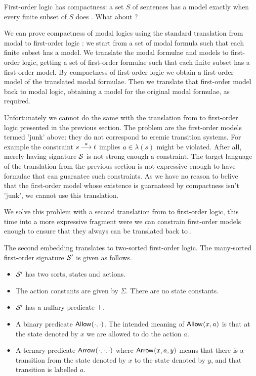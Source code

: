 \NI First-order logic has compactness: a set $S$ of sentences has a
model exactly when every finite subset of $S$ does \cite[Chapter
  4.3]{EndertonHB:matinttl}. What about \ELABR{}? 

We can prove compactness of modal logics using the standard
translation from modal to first-order logic \cite{BlackburnP:modlog}:
we start from a set of modal formula such that each finite subset has
a model. We translate the modal formulae and models to first-order
logic, getting a set of first-order formulae such that each finite
subset has a first-order model. By compactness of first-order logic we
obtain a first-order model of the translated modal formulae. Then we
translate that first-order model back to modal logic, obtaining a
model for the original modal formulae, as required.

Unfortunately we cannot do the same with the translation from \ELABR{}
to first-order logic presented in the previous section. The problem
are the first-order models termed 'junk' above: they do not correspond
to eremic transition systems.  For example the constraint $s
\stackrel{a}{\longrightarrow} t$ implies $a \in \lambda(s)$ might be violated. After all,
merely having signature $\mathcal{S}$ is not strong enough a constraint. The
target language of the translation from the previous section is not
expressive enough to have formulae that can guarantee such
constraints.  As we have no reason to belive that the first-order
model whose existence is guarnateed by compactness isn't 'junk', we
cannot use this translation.

We solve this problem with a second translation from \ELABR{} to
first-order logic, this time into a more expressive fragment were we
can constrain first-order models enough to ensure that they always can
be translated back to \ELFULL{}.

The second embedding translates \ELFULL{} to two-sorted first-order
logic. The many-sorted first-order signature $\mathcal{S}'$ is given as follows.
\begin{itemize}

\item $\mathcal{S}'$ has two sorts, states and actions. 

\item The action constants are given by $\Sigma$. There
are no state constants. 

\item $\mathcal{S}'$ has a nullary predicate $\top$.

\item A binary predicate $\mathsf{Allow}^{}(\cdot, \cdot)$. The intended
  meaning of $\mathsf{Allow}^{}(x, a)$ is that at the state denoted by $x$ we
  are allowed to do the action $a$.

\item A ternary predicate $\mathsf{Arrow}^{}(\cdot, \cdot, \cdot)$ where
  $\mathsf{Arrow}^{}(x, a, y)$ means that there is a transition from the
  state denoted by $x$ to the state denoted by $y$, and that
  transition is labelled $a$.

\end{itemize}

